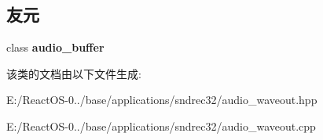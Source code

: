 \subsection*{友元}
\begin{DoxyCompactItemize}
\item 
\mbox{\label{classaudio__waveout_a4ea4d5c2bd497b607e5918548128178a}} 
class {\bfseries audio\+\_\+buffer}
\end{DoxyCompactItemize}


该类的文档由以下文件生成\+:\begin{DoxyCompactItemize}
\item 
E\+:/\+React\+O\+S-\/0../base/applications/sndrec32/audio\+\_\+waveout.\+hpp\item 
E\+:/\+React\+O\+S-\/0../base/applications/sndrec32/audio\+\_\+waveout.\+cpp\end{DoxyCompactItemize}
